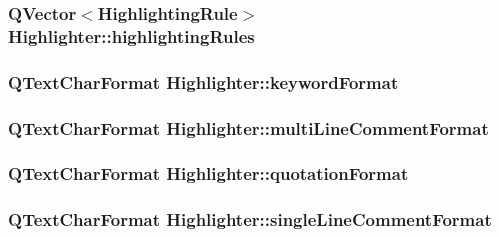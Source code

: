 \hypertarget{class_highlighter_aa23f8b3f4ddd1354f508b46d77897fe5}{
\subsubsection[{highlighting\-Rules}]{\setlength{\rightskip}{0pt plus 5cm}Q\-Vector$<${\bf Highlighting\-Rule}$>$ Highlighter\-::highlighting\-Rules\hspace{0.3cm}{\ttfamily [private]}}}\label{class_highlighter_aa23f8b3f4ddd1354f508b46d77897fe5}
\hypertarget{class_highlighter_acf807339a8cd02097a81e455ef2686d2}{
\subsubsection[{keyword\-Format}]{\setlength{\rightskip}{0pt plus 5cm}Q\-Text\-Char\-Format Highlighter\-::keyword\-Format\hspace{0.3cm}{\ttfamily [private]}}}\label{class_highlighter_acf807339a8cd02097a81e455ef2686d2}
\hypertarget{class_highlighter_ad4661760f22cf913b696ec90dea994c0}{
\subsubsection[{multi\-Line\-Comment\-Format}]{\setlength{\rightskip}{0pt plus 5cm}Q\-Text\-Char\-Format Highlighter\-::multi\-Line\-Comment\-Format\hspace{0.3cm}{\ttfamily [private]}}}\label{class_highlighter_ad4661760f22cf913b696ec90dea994c0}
\hypertarget{class_highlighter_a3d4bf96c8ea27ba18bca4adc6b306db8}{
\subsubsection[{quotation\-Format}]{\setlength{\rightskip}{0pt plus 5cm}Q\-Text\-Char\-Format Highlighter\-::quotation\-Format\hspace{0.3cm}{\ttfamily [private]}}}\label{class_highlighter_a3d4bf96c8ea27ba18bca4adc6b306db8}
\hypertarget{class_highlighter_ad1ca0f6942b0451781d7e32f1781f22b}{
\subsubsection[{single\-Line\-Comment\-Format}]{\setlength{\rightskip}{0pt plus 5cm}Q\-Text\-Char\-Format Highlighter\-::single\-Line\-Comment\-Format\hspace{0.3cm}{\ttfamily [private]}}}\label{class_highlighter_ad1ca0f6942b0451781d7e32f1781f22b}



